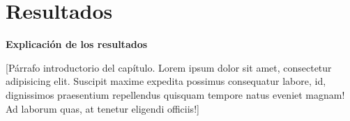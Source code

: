 \chapter{Resultados}\label{chap:resultados}
\textbf{Explicación de los resultados}

[Párrafo introductorio del capítulo. Lorem ipsum dolor sit amet, consectetur adipisicing elit. Suscipit maxime expedita possimus consequatur labore, id, dignissimos praesentium repellendus quisquam tempore natus eveniet magnam! Ad laborum quas, at tenetur eligendi officiis!]